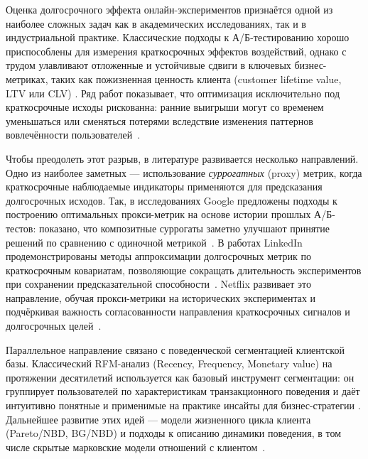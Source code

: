 
Оценка долгосрочного эффекта онлайн-экспериментов признаётся одной из наиболее
сложных задач как в академических исследованиях, так и в индустриальной
практике. Классические подходы к А/Б-тестированию хорошо приспособлены для
измерения краткосрочных эффектов воздействий, однако с трудом улавливают
отложенные и устойчивые сдвиги в ключевых бизнес-метриках, таких как
пожизненная ценность клиента (customer lifetime value, LTV или CLV)
\cite{crook2009seven,kohavi2020trustworthy}. Ряд работ показывает, что
оптимизация исключительно под краткосрочные исходы рискованна: ранние
выигрыши могут со временем уменьшаться или сменяться потерями вследствие
изменения паттернов вовлечённости пользователей~\cite{sadeghi2021novelty,
kohavi2015focus,kohavi2016pitfalls,dmitriev2016dirty}.

Чтобы преодолеть этот разрыв, в литературе развивается несколько направлений.
Одно из наиболее заметных --- использование \textit{суррогатных} (proxy) метрик,
когда краткосрочные наблюдаемые индикаторы применяются для предсказания
долгосрочных исходов. Так, в исследованиях Google предложены подходы к
построению оптимальных прокси-метрик на основе истории прошлых А/Б-тестов:
показано, что композитные суррогаты заметно улучшают принятие решений по
сравнению с одиночной метрикой~\cite{tripuraneni2024}. В работах LinkedIn
продемонстрированы методы аппроксимации долгосрочных метрик по краткосрочным
ковариатам, позволяющие сокращать длительность экспериментов при сохранении
предсказательной способности~\cite{duan2021online}. Netflix развивает это
направление, обучая прокси-метрики на исторических экспериментах и подчёркивая
важность согласованности направления краткосрочных сигналов и долгосрочных
целей~\cite{dimakopoulou2023evaluating}.

Параллельное направление связано с поведенческой сегментацией клиентской базы.
Классический RFM-анализ (Recency, Frequency, Monetary value) на протяжении
десятилетий используется как базовый инструмент сегментации: он группирует
пользователей по характеристикам транзакционного поведения и даёт интуитивно
понятные и применимые на практике инсайты для бизнес-стратегии
\cite{fader2005rfm,rosset2003modeling}. Дальнейшее развитие этих идей --- модели
жизненного цикла клиента (Pareto/NBD, BG/NBD) и подходы к описанию динамики
поведения, в том числе скрытые марковские модели отношений с
клиентом~\cite{schmittlein1987,schmittlein1987customer,fader2005counting,fader2010,netzer2008mm}.

